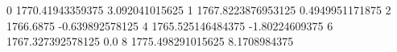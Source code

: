0 1770.41943359375 3.092041015625
1 1767.8223876953125 0.4949951171875
2 1766.6875 -0.639892578125
4 1765.525146484375 -1.80224609375
6 1767.327392578125 0.0
8 1775.498291015625 8.1708984375
